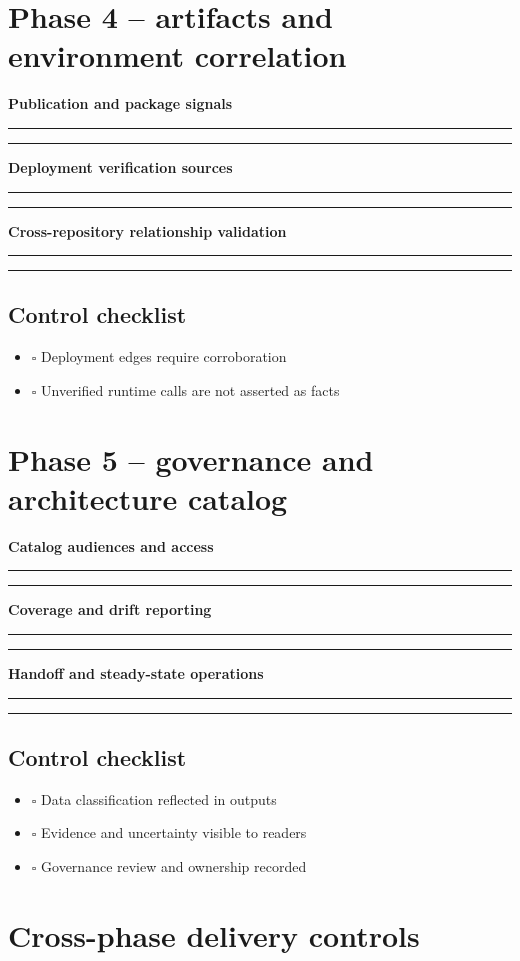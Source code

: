 \documentclass[11pt,letterpaper]{article}
\newcommand{\Field}[2]{\par\noindent\textbf{#1}\par\vspace{1em}\noindent\rule{0.96\linewidth}{0.4pt}\par\vspace{1.0em}\noindent\rule{0.96\linewidth}{0.4pt}\par\vspace{1em}}
\begin{document}
\section{Phase 4 -- artifacts and environment correlation}
\Field{Publication and package signals}{Document how build output differs from a proven published artifact.}
\Field{Deployment verification sources}{Record registry digests, deployment APIs, IaC and environment evidence.}
\Field{Cross-repository relationship validation}{Specify acceptance checks and provenance for shared workflow calls.}
\subsection{Control checklist}
\begin{itemize}
\item $\square$ Deployment edges require corroboration
\item $\square$ Unverified runtime calls are not asserted as facts
\end{itemize}


\section{Phase 5 -- governance and architecture catalog}
\Field{Catalog audiences and access}{Identify enterprise architects, AppSec, component owners and approvers.}
\Field{Coverage and drift reporting}{Document change detection, timestamp, stale/denied reporting and notifications.}
\Field{Handoff and steady-state operations}{Specify job schedules, service ownership, escalation and risk review.}
\subsection{Control checklist}
\begin{itemize}
\item $\square$ Data classification reflected in outputs
\item $\square$ Evidence and uncertainty visible to readers
\item $\square$ Governance review and ownership recorded
\end{itemize}


\section{Cross-phase delivery controls}
\end{document}
